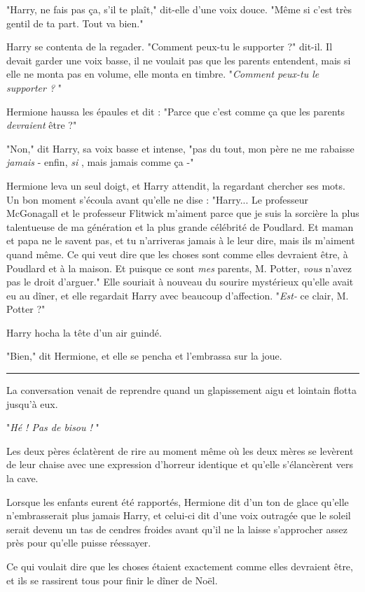 "Harry, ne fais pas ça, s'il te plaît," dit-elle d'une voix douce. "Même si c'est très gentil de ta part. Tout va bien."

Harry se contenta de la regader. "Comment peux-tu le supporter ?" dit-il. Il devait garder une voix basse, il ne voulait pas que les parents entendent, mais si elle ne monta pas en volume, elle monta en timbre. "\emph{Comment peux-tu le supporter ?} "

Hermione haussa les épaules et dit : "Parce que c'est comme ça que les parents \emph{devraient}  être ?"

"Non," dit Harry, sa voix basse et intense, "pas du tout, mon père ne me rabaisse \emph{jamais}  - enfin, \emph{si} , mais jamais comme ça -"

Hermione leva un seul doigt, et Harry attendit, la regardant chercher ses mots. Un bon moment s'écoula avant qu'elle ne dise : "Harry... Le professeur McGonagall et le professeur Flitwick m'aiment parce que je suis la sorcière la plus talentueuse de ma génération et la plus grande célébrité de Poudlard. Et maman et papa ne le savent pas, et tu n'arriveras jamais à le leur dire, mais ils m'aiment quand même. Ce qui veut dire que les choses sont comme elles devraient être, à Poudlard et à la maison. Et puisque ce sont \emph{mes}  parents, M. Potter, \emph{vous}  n'avez pas le droit d'arguer." Elle souriait à nouveau du sourire mystérieux qu'elle avait eu au dîner, et elle regardait Harry avec beaucoup d'affection. "\emph{Est-} ce clair, M. Potter ?"

Harry hocha la tête d'un air guindé.

"Bien," dit Hermione, et elle se pencha et l'embrassa sur la joue.
\par\noindent\rule{\textwidth}{0.4pt}
La conversation venait de reprendre quand un glapissement aigu et lointain flotta jusqu'à eux.

"\emph{Hé ! Pas de bisou !} "

Les deux pères éclatèrent de rire au moment même où les deux mères se levèrent de leur chaise avec une expression d'horreur identique et qu'elle s'élancèrent vers la cave.

Lorsque les enfants eurent été rapportés, Hermione dit d'un ton de glace qu'elle n'embrasserait plus jamais Harry, et celui-ci dit d'une voix outragée que le soleil serait devenu un tas de cendres froides avant qu'il ne la laisse s'approcher assez près pour qu'elle puisse réessayer.

Ce qui voulait dire que les choses étaient exactement comme elles devraient être, et ils se rassirent tous pour finir le dîner de Noël.

